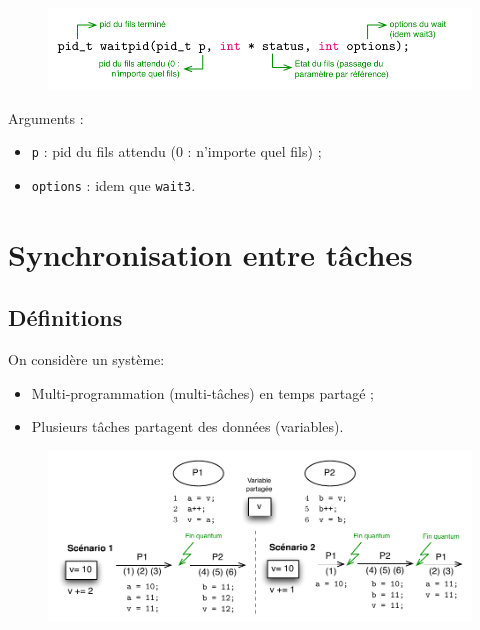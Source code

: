 \documentclass[11pt,english,french]{scrreprt}
\theoremstyle{remark}
\theoremstyle{definition}
\begin{document}
\begin{figure}[h!]
	\center
	\vspace{-20pt}
	\includegraphics[scale=.75]{img/waitpid}
	\vspace{-10pt}
\end{figure}
Arguments :\begin{itemize}
	\item \lstinline!p! : pid du fils attendu (0 : n'importe quel fils) ;
	\item \lstinline!options! : idem que \lstinline!wait3!.
\end{itemize}

\chapter{Synchronisation entre tâches}

\section{Définitions}
On considère un système:
\begin{itemize}
	\item Multi-programmation (multi-tâches) en temps partagé ;
	\item Plusieurs tâches partagent des données (variables).
\end{itemize}

\begin{figure}[h!]
	\center
	\vspace{-10pt}
	\includegraphics[scale=1]{img/partage-variable}
	\vspace{-10pt}
\end{figure}
\end{document}
